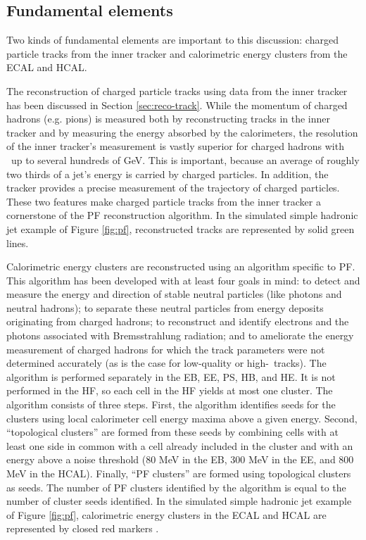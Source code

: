 \subsection{Fundamental elements}

Two kinds of fundamental elements are important to this
discussion: charged particle tracks from the inner tracker
and calorimetric energy clusters from the ECAL and HCAL.

The reconstruction of charged particle tracks using data from
the inner tracker has been discussed in Section \ref{sec:reco-track}.
While the momentum of charged hadrons (e.g. pions) is measured
both by reconstructing tracks in the inner tracker and
by measuring the energy absorbed by the calorimeters, the 
resolution of the inner tracker's measurement is vastly superior
for charged hadrons with \pt~up to several hundreds of GeV.
This is important, because an average of roughly two thirds of a
jet's energy is carried by charged particles.
In addition, the tracker provides a precise measurement of the
trajectory of charged particles.  These two features make
charged particle tracks from the inner tracker a cornerstone of
the PF reconstruction algorithm.  In the simulated simple hadronic jet 
example of Figure \ref{fig:pf}, reconstructed tracks are represented
by solid green lines.

Calorimetric energy clusters are reconstructed using an algorithm specific to PF.
This algorithm has been 
developed with at least four goals in mind:
to detect and measure the energy and direction of 
stable neutral particles (like photons and neutral hadrons);
to separate these neutral particles from energy deposits originating from charged
hadrons;
to reconstruct and identify electrons and the photons associated with 
Bremsstrahlung radiation; and to ameliorate the energy measurement
of charged hadrons for which the track parameters were not determined
accurately (as is the case for low-quality or high-\pt~tracks).
The algorithm is performed separately in the EB, EE, PS, 
HB, and HE.  It is not performed in the HF, so each cell in the HF 
yields at most one cluster.  The algorithm consists 
of three steps.  First, the algorithm identifies seeds for the clusters
using local calorimeter cell energy maxima above a given energy.
Second, ``topological clusters'' are formed from these seeds by combining cells with 
at least one side in common with a cell already included in the cluster
and with an energy above a noise threshold (80 MeV in the EB, 300 MeV in the EE, and 800 MeV in the HCAL).
Finally, ``PF clusters'' are formed using topological clusters as seeds.
The number of PF clusters identified by the algorithm is equal 
to the number of cluster seeds identified.
In the simulated simple hadronic jet example of Figure \ref{fig:pf}, calorimetric energy clusters
in the ECAL and HCAL are represented by closed red markers \cite{pf-1}.


